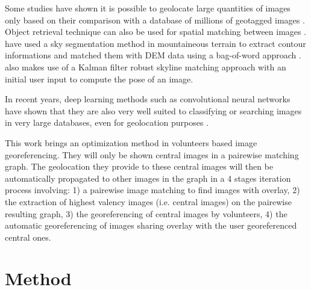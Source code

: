 \documentclass[fleqn,10pt,lineno]{wlpeerj} %
\begin{document}
Some studies have shown it is possible to geolocate large quantities of 
images only based on their comparison with a database of millions of geotagged 
images \citep{hays2015,weyand2016}. Object retrieval technique can also be used 
for spatial matching between images \citep{philbin2007}. 
\cite{baatz2012} have used a sky segmentation method in mountaineous terrain 
to extract contour informations and matched them with DEM data using a 
bag-of-word approach \citep{feifei2005}. \cite{produit2014} also makes use
of a Kalman filter robust skyline matching approach with an initial user input 
to compute the pose of an image.


In recent years, deep learning methods such as convolutional neural networks 
\citep{lecun2015deep} have shown that they are also very well suited to classifying 
or searching images in very large databases, even for geolocation purposes \citep{weyand2016}.

This work brings an optimization method in volunteers based image georeferencing.
They will only be shown central images in a pairewise matching graph. 
The geolocation they provide to these central images will then be automatically 
propagated to other images in the graph in a 4 stages iteration process involving:
1) a pairewise image matching to find images with overlay, 
2) the extraction of highest valency images (i.e. central images) on the 
pairewise resulting graph, 
3) the georeferencing of central images by volunteers, 
4) the automatic georeferencing of images sharing overlay with the user 
georeferenced central ones.

\section*{Method}
\end{document}
